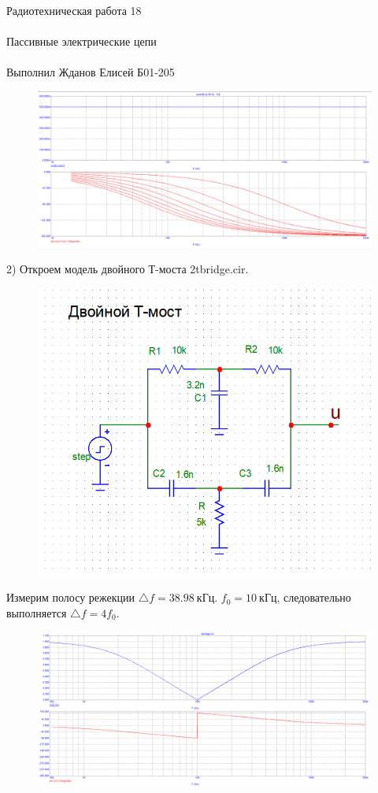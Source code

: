 \documentclass{astroedu-lab}
\begin{document}
\begin{problem}{\huge Радиотехническая работа 18\\\\Пассивные электрические цепи\\\\Выполнил Жданов Елисей Б01-205}
\begin{figure}[!h]
	\centering
	\includegraphics[width=1\textwidth]{3_2.png}
	\label{fig:boiler}
\end{figure}

2) Откроем модель двойного Т-моста 2tbridge.cir.

\begin{figure}[!h]
	\centering
	\includegraphics[width=1\textwidth]{3_5.png}
	\label{fig:boiler}
\end{figure}

Измерим полосу режекции $\triangle f = 38.98 \: \text{кГц}$. $f_0 = 10 \: \text{кГц}$, следовательно выполняется $\triangle f = 4 f_0$.

\begin{figure}[!h]
	\centering
	\includegraphics[width=1\textwidth]{3_6.png}
	\label{fig:boiler}
\end{figure}


\end{problem}
\end{document}
